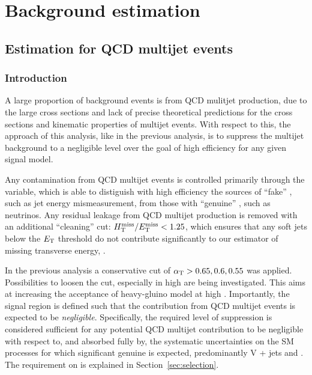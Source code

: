 \section{Background estimation}
\label{sec:background}

\subsection{Estimation for QCD multijet events \label{sec:qcd}}
\subsubsection{Introduction}

A large proportion of background events is from QCD mulitjet production, due to the large cross sections and lack of precise theoretical
predictions for the cross sections and kinematic properties of multijet events. With respect to this, the approach of this analysis, like in the previous analysis, is to suppress the multijet background to a negligible level over the goal of high efficiency for any given signal model.
 
Any contamination from QCD multijet events is controlled primarily through the \alphat variable, which is able to distiguish with high efficiency the sources of ``fake'' \met, such as jet energy mismeasurement, from those with ``genuine'' \met, such as neutrinos. Any residual leakage from QCD multijet production is removed with an additional ``\met cleaning'' cut: $\mhtmet < 1.25$, which ensures that any soft jets below the $\Et$ threshold do not contribute significantly to our estimator of missing transverse energy, \mht.

In the previous analysis a conservative cut of $\alphat > 0.65,0.6,0.55$ was applied. Possibilities to loosen the \alphat cut, especially in high \scalht are being investigated. This aims at increasing the acceptance of heavy-gluino model at high \scalht. Importantly, the signal region is defined such that the contribution from QCD multijet events is expected to be {\it negligible}. Specifically, the required level of suppression is considered sufficient for any potential QCD multijet contribution to be negligible with respect to, and absorbed fully by, the systematic uncertainties on the SM processes for which significant genuine \met is expected, predominantly V + jets and \ttbar. The requirement on \alphat is explained in Section~\ref{sec:selection}.

